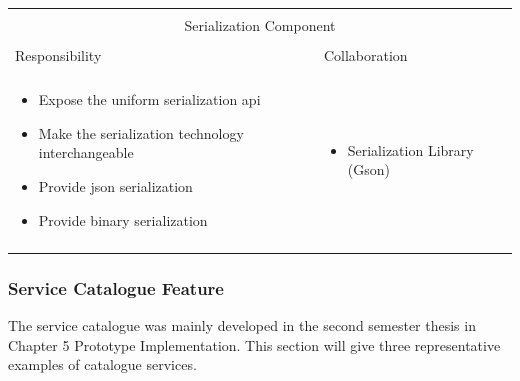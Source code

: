 \vspace{0.5cm} \noindent 
\begin{tabular}{|l|l|}
    \cline{1-2}
    \multicolumn{2}{|c|}{} \\[-0.3cm]
    \multicolumn{2}{|c|}{Serialization Component} \\ 
    \multicolumn{2}{|c|}{} \\[-0.3cm]
    \cline{1-2}
    Responsibility & Collaboration \\
    \cline{1-2}
    & \\[-0.2cm]
    \begin{minipage}{0.47\textwidth}
        \begin{itemize}
          \item Expose the uniform serialization \gls{api}
          \item Make the serialization technology interchangeable
          \item Provide \gls{json} serialization
          \item Provide binary serialization
        \end{itemize} 
    \end{minipage}
	&
    \begin{minipage}{0.47\textwidth}
        \begin{itemize}
          \item Serialization Library (Gson)
        \end{itemize} 
    \end{minipage}
	\\ & \\
    \hline
\end{tabular}

\newpage
\subsubsection{Service Catalogue Feature}

The service catalogue was mainly developed in the second semester thesis
\cite{biedermann2016project2} in Chapter 5 Prototype Implementation.
This section will give three representative examples of catalogue services.\\

